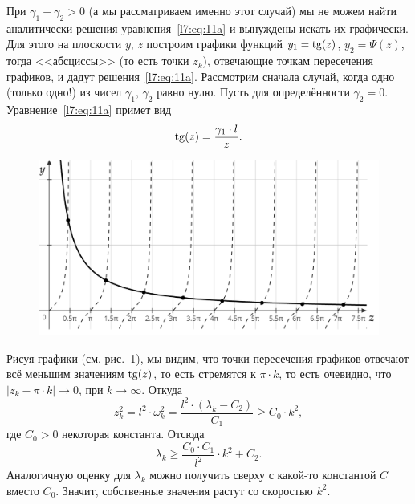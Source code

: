 \noindent При $\gamma_1+\gamma_2>0$ (а мы рассматриваем именно этот случай) мы не можем найти аналитически решения уравнения~\eqref{l7:eq:11a} и вынуждены искать их графически. Для этого на плоскости $y,\,z$ построим графики функций $y_1=\operatorname{tg}(z)$, $y_2=\Psi(z)${\mb,  тогда}  <<абсциссы>> (то есть точки $z_k$){\mb,} отвечающие точкам пересечения графиков{\mb,} и дадут решения~\eqref{l7:eq:11a}. Рассмотрим сначала случай, когда одно (только одно!) из чисел $\gamma_1,\,\gamma_2$ равно нулю. Пусть для определённости $\gamma_2=0$. Уравнение~\eqref{l7:eq:11a} примет вид
\begin{equation*}
	\operatorname{tg}(z)=\dfrac{\gamma_1\cdot l}{z}.
\end{equation*}
\begin{figure}[H]\centering
	\includegraphics[width=0.65\linewidth]{picture1}
	\caption{}
	\label{l7:fig:1}
\end{figure}
Рисуя графики (см. рис.~\ref{l7:fig:1}), мы видим, что точки пересечения графиков отвечают всё меньшим значениям $\operatorname{tg}(z)$, то есть стремятся к $\pi\cdot k$, то есть очевидно, что $|z_k-\pi\cdot  k|\to0$, при $k\to\infty$. Откуда
\begin{equation*}
	 z_k^2=l^2\cdot\omega_k^2=\dfrac{l^2\cdot(\lambda_k-C_2)}{C_1}\geqslant C_0\cdot k^2,
\end{equation*}	
где $C_0>0$ некоторая константа. Отсюда
\begin{equation*}
	\lambda_k\geqslant\frac{C_0\cdot C_1}{l^2}\cdot k^2+C_2.
\end{equation*}
Аналогичную оценку для $\lambda_k$ можно получить сверху с какой-то константой $C$ вместо $C_0$. Значит, собственные значения растут со скоростью $k^2$.

